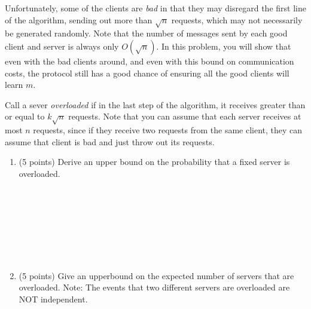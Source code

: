 \documentclass[11pt]{article}
\newcommand{\ans}[1]{ }
\begin{document}
\begin{enumerate}
Unfortunately, some of the clients are \emph{bad} in that they may disregard the first line of the algorithm, sending out more than $\sqrt{n}$ requests, which may not necessarily be generated randomly.  Note that the number of messages sent by each good client and server is always only $O(\sqrt{n})$.  In this problem, you will show that even with the bad clients around, and even with this bound on communication costs, the protocol still has a good chance of ensuring all the good clients will learn $m$.

Call a sever \emph{overloaded} if in the last step of the algorithm, it receives greater than or equal to $k\sqrt{n}$ requests.  Note that you can assume that each server receives at most $n$ requests, since if they receive two requests from the same client, they can assume that client is bad and just throw out its requests.  
\begin{enumerate}

\item (5 points) Derive an upper bound on the probability that a fixed server is overloaded.
\ans{There are at most $n$ requests total that each server receives and these are distributed over $\sqrt{n}$ possible tags.  Thus, at most $\sqrt{n}/k$ of the tags have more than $k \sqrt{n}$ requests.  Thus the probability of being overloaded is at most $1/k$} \\ \ \\ \ \\ \ \\ \ \\ \ \\ \ \\ \ \\
  
\pagebreak 
  
\item (5 points) Give an upperbound on the expected number of servers that are overloaded.  Note: The events that two different servers are overloaded are NOT independent.

\ans{Using linearity of expectation, the expected number of informed processors that are overloaded is at most $n/k$}  \ \\ \ \\ \ \\ \ \\ \ \\ \ \\ \ \\ \ \\


\end{enumerate}
\end{enumerate}
\end{document}
